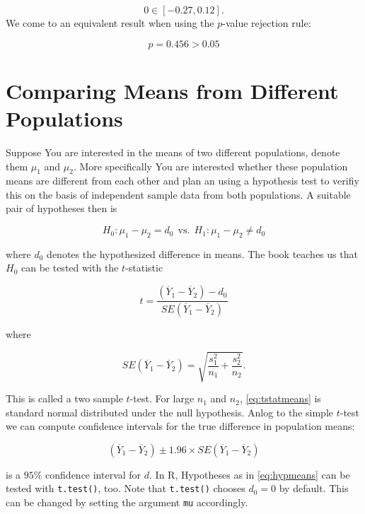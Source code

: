 \documentclass[]{book}
\theoremstyle{definition}
\theoremstyle{definition}
\theoremstyle{definition}
\theoremstyle{remark}
\begin{document}
\[ 0 \in \left[-0.27,0.12\right]. \] We come to an equivalent result
when using the \(p\)-value rejection rule:

\[ p = 0.456 > 0.05 \]

\section{Comparing Means from Different
Populations}\label{comparing-means-from-different-populations}

Suppose You are interested in the means of two different populations,
denote them \(\mu_1\) and \(\mu_2\). More specifically You are
interested whether these population means are different from each other
and plan an using a hypothesis test to verifiy this on the basis of
independent sample data from both populations. A suitable pair of
hypotheses then is

\begin{equation}
H_0: \mu_1 - \mu_2 = d_0 \ \ \text{vs.} \ \ H_1: \mu_1 - \mu_2 \neq d_0 \label{eq:hypmeans}
\end{equation}

where \(d_0\) denotes the hypothesized difference in means. The book
teaches us that \(H_0\) can be tested with the \(t\)-statistic

\begin{equation}
t=\frac{(\overline{Y}_1 - \overline{Y}_2) - d_0}{SE(\overline{Y}_1 - \overline{Y}_2)} \label{eq:tstatmeans}
\end{equation}

where

\begin{equation}
SE(\overline{Y}_1 - \overline{Y}_2) = \sqrt{\frac{s_1^2}{n_1} + \frac{s_2^2}{n_2}}.
\end{equation}

This is called a two sample \(t\)-test. For large \(n_1\) and \(n_2\),
\eqref{eq:tstatmeans} is standard normal distributed under the null
hypothesis. Anlog to the simple \(t\)-test we can compute confidence
intervals for the true difference in population means:

\[ (\overline{Y}_1 - \overline{Y}_2) \pm 1.96 \times SE(\overline{Y}_1 - \overline{Y}_2) \]

is a \(95\%\) confidence interval for \(d\). In R, Hypotheses as in
\eqref{eq:hypmeans} can be tested with \texttt{t.test()}, too. Note that
\texttt{t.test()} chooses \(d_0 = 0\) by default. This can be changed by
setting the argument \texttt{mu} accordingly.
\end{document}
